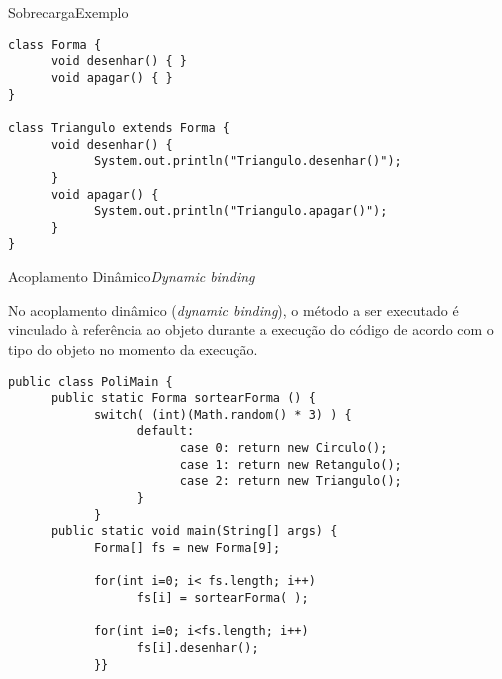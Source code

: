 \begin{frame}[fragile]{Sobrecarga}{Exemplo}

\begin{center}

\begin{lstlisting}
class Forma {
      void desenhar() { }
      void apagar() { }
}

class Triangulo extends Forma {
      void desenhar() { 
            System.out.println("Triangulo.desenhar()");
      }
      void apagar() { 
            System.out.println("Triangulo.apagar()");
      }
}
\end{lstlisting}

\end{center}

\end{frame}

\begin{frame}[fragile]{Acoplamento Dinâmico}{\it Dynamic binding}

  \footnotesize No acoplamento dinâmico ({\it dynamic binding}), o
  método a ser executado é vinculado à referência ao objeto durante a
  execução do código de acordo com o tipo do objeto no momento da
  execução.

\begin{lstlisting}
public class PoliMain {
      public static Forma sortearForma () {
            switch( (int)(Math.random() * 3) ) {
                  default:
                        case 0: return new Circulo();
                        case 1: return new Retangulo();
                        case 2: return new Triangulo();
                  }
            }
      public static void main(String[] args) {
            Forma[] fs = new Forma[9];
		
            for(int i=0; i< fs.length; i++)
                  fs[i] = sortearForma( );

            for(int i=0; i<fs.length; i++)
                  fs[i].desenhar();
            }}
\end{lstlisting}

\end{frame}

